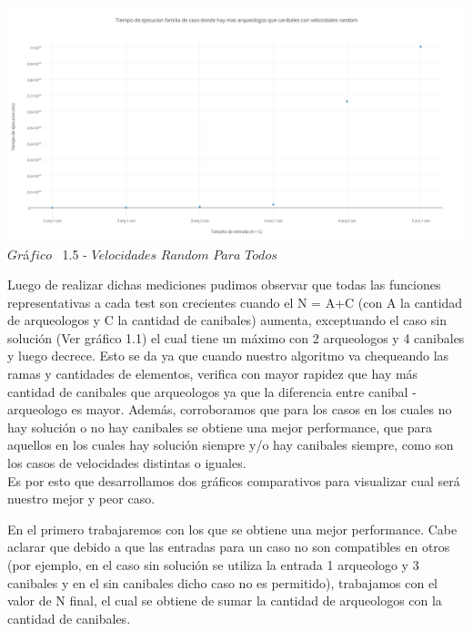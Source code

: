   
   \vspace*{0.3cm} \vspace*{0.3cm}
  \begin{center}
 \includegraphics[scale=0.45]{./EJ1/velrandom.png}
 {$Gr$\'a$fico$ \ 1.5 - $Velocidades$ $Random$ $Para$ $Todos$}
  \end{center}
  \vspace*{0.3cm}
  
Luego de realizar dichas mediciones pudimos observar que todas las funciones representativas a cada test son crecientes cuando el N = A+C (con A la cantidad de arqueologos y C la cantidad de canibales) aumenta, exceptuando el caso sin soluci\'on (Ver gr\'afico 1.1) el cual tiene un m\'aximo con 2 arqueologos y 4 canibales y luego decrece. Esto se da ya que cuando nuestro algoritmo va chequeando las ramas y cantidades de elementos, verifica con mayor rapidez que hay m\'as cantidad de canibales que arqueologos ya que la diferencia entre canibal - arqueologo es mayor.
 Adem\'as, corroboramos que para los casos en los cuales no hay soluci\'on o no hay canibales se obtiene una mejor performance, que para aquellos en los cuales hay soluci\'on siempre y/o hay canibales siempre, como son los casos de velocidades distintas o iguales. \\
Es por esto que desarrollamos dos gr\'aficos comparativos para visualizar cual ser\'a nuestro mejor y peor caso.

En el primero trabajaremos con los que se obtiene una mejor performance. Cabe aclarar que debido a que las entradas para un caso no son compatibles en otros (por ejemplo, en el caso sin soluci\'on se utiliza la entrada 1 arqueologo y 3 canibales y en el sin canibales dicho caso no es permitido), trabajamos con el valor de N final, el cual se obtiene de sumar la cantidad de arqueologos con la cantidad de canibales.\\

